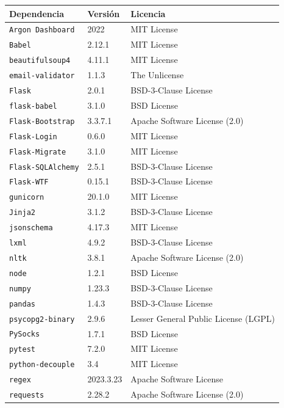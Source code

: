 \begin{table}[p]
	\centering
	\begin{tabularx}{\linewidth}{ p{} p{} p{} }
		\toprule
		\textbf{Dependencia} & \textbf{Versión} & \textbf{Licencia} \\
		\midrule
		\texttt{Argon Dashboard} & 2022 & MIT License\\
		\texttt{Babel} & 2.12.1 & MIT License\\
		\texttt{beautifulsoup4} & 4.11.1 & MIT License \\
		\texttt{email-validator} & 1.1.3 & The Unlicense \\
		\texttt{Flask} & 2.0.1 & BSD-3-Clause License\\
		\texttt{flask-babel} & 3.1.0 & BSD License\\
		\texttt{Flask-Bootstrap} & 3.3.7.1 & Apache Software License (2.0)\\
		\texttt{Flask-Login} & 0.6.0 & MIT License \\
		\texttt{Flask-Migrate} & 3.1.0 & MIT License \\
		\texttt{Flask-SQLAlchemy} & 2.5.1 & BSD-3-Clause License \\
		\texttt{Flask-WTF} & 0.15.1 & BSD-3-Clause License \\
		\texttt{gunicorn} & 20.1.0 & MIT License \\
		\texttt{Jinja2} & 3.1.2 & BSD-3-Clause License \\
		\texttt{jsonschema} & 4.17.3 & MIT License \\
		\texttt{lxml} & 4.9.2 & BSD-3-Clause License \\
		\texttt{nltk} & 3.8.1 & Apache Software License (2.0)\\
		\texttt{node} & 1.2.1 & BSD License\\
		\texttt{numpy} & 1.23.3 & BSD-3-Clause License \\
		\texttt{pandas} & 1.4.3 & BSD-3-Clause License \\
		\texttt{psycopg2-binary} & 2.9.6 & Lesser General Public License (LGPL) \\
		\texttt{PySocks} & 1.7.1 & BSD License \\
		\texttt{pytest} & 7.2.0 & MIT License \\
		\texttt{python-decouple} & 3.4 & MIT License \\
		\texttt{regex} & 2023.3.23 & Apache Software License  \\
		\texttt{requests} & 2.28.2 & Apache Software License (2.0) \\

\end{tabularx}
\end{table}
